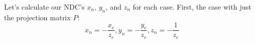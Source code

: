 \documentclass[11pt]{tingpset}
\begin{document}
    Let's calculate our NDC's $x_n$, $y_n$, and $z_n$ for each case. First, the case with just the projection matrix $P$:
    \[
      x_n = -\frac{x_e}{z_e}, y_n = -\frac{y_e}{z_e}, z_n = -\frac{1}{z_e}
    \]
\end{document}
